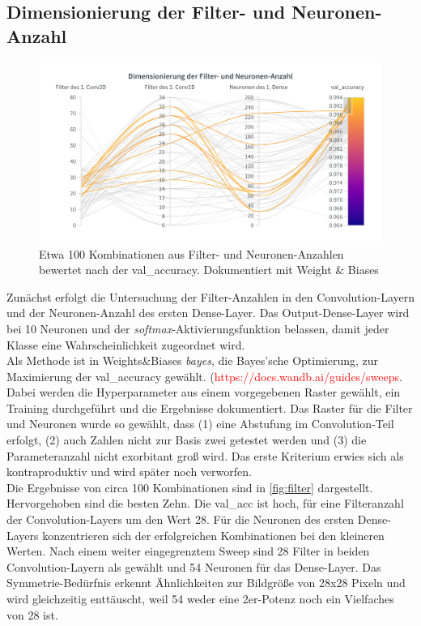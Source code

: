 \documentclass[
fontsize=12pt,					%
paper=a4,						%
twoside=true, 					%
listof=totoc, 					%
bibliography=totoc,				%
titlepage, 						%
headsepline, 					%
DIV=12,							%
BCOR=6mm,						%
cleardoublepage=empty,			%
parskip,							%
ngerman
]{scrartcl}
\begin{document}
\subsection{Dimensionierung der Filter- und Neuronen-Anzahl}

\begin{figure}
	\centering
	\includegraphics[width=0.7\linewidth]{images/Filter}
	\caption{Etwa 100 Kombinationen aus Filter- und Neuronen-Anzahlen bewertet nach der val\_accuracy. Dokumentiert mit Weight \& Biases}
	\label{fig:filter}
\end{figure}

Zunächst erfolgt die Untersuchung der Filter-Anzahlen in den Convolution-Layern und der Neuronen-Anzahl des ersten Dense-Layer. Das Output-Dense-Layer wird bei 10 Neuronen und der \emph{softmax}-Aktivierungsfunktion belassen, damit jeder Klasse eine Wahrscheinlichkeit zugeordnet wird.\\
Als Methode ist in Weights\&Biases \emph{bayes}, die Bayes'sche Optimierung, zur Maximierung der val\_accuracy gewählt. (\textcolor{red}{https://docs.wandb.ai/guides/sweeps}. Dabei werden die Hyperparameter aus einem vorgegebenen Raster gewählt, ein Training durchgeführt und die Ergebnisse dokumentiert. Das Raster für die Filter und Neuronen wurde so gewählt, dass (1) eine Abstufung im Convolution-Teil erfolgt, (2) auch Zahlen nicht zur Basis zwei getestet werden und (3) die Parameteranzahl nicht exorbitant groß wird. Das erste Kriterium erwies sich als kontraproduktiv und wird später noch verworfen.\\
Die Ergebnisse von circa 100 Kombinationen sind in \autoref{fig:filter} dargestellt. Hervorgehoben sind die besten Zehn. Die val\_acc ist hoch, für eine Filteranzahl der Convolution-Layers um den Wert 28. Für die Neuronen des ersten Dense-Layers konzentrieren sich der erfolgreichen Kombinationen bei den kleineren Werten. Nach einem weiter eingegrenztem Sweep sind 28 Filter in beiden Convolution-Layern als gewählt und 54 Neuronen für das Dense-Layer. Das Symmetrie-Bedürfnis erkennt Ähnlichkeiten zur Bildgröße von 28x28 Pixeln und wird gleichzeitig enttäuscht, weil 54 weder eine 2er-Potenz noch ein Vielfaches von 28 ist.
\end{document}

